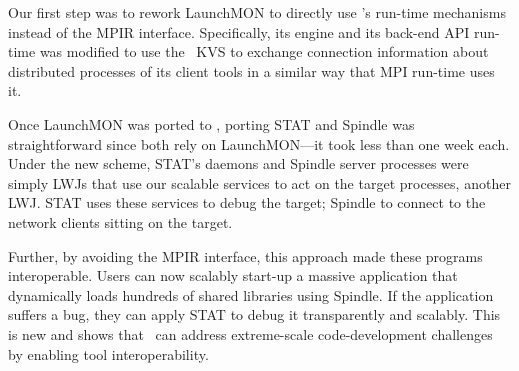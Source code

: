 Our first step was to rework LaunchMON
to directly use \flux's run-time mechanisms instead 
of the MPIR interface. Specifically, its engine
and its back-end API run-time
was modified to use the \flux\ KVS
to exchange connection information about 
distributed processes of its client tools in a similar way that MPI run-time 
uses it. 

Once LaunchMON was ported to \flux, porting
STAT and {\sc Spindle} was
straightforward since both rely on LaunchMON---it took less than one week each.
Under the new scheme, STAT's daemons 
and {\sc Spindle} server processes were simply LWJs 
that use our scalable services to act on the target processes, 
another LWJ. STAT uses these services to debug the 
target; {\sc Spindle} to connect to the network clients sitting on the target.

Further, by avoiding the MPIR interface, 
this approach made these programs interoperable.
Users can now scalably start-up a massive application 
that dynamically loads hundreds of shared libraries 
using {\sc Spindle}.
If the application suffers a bug, they can apply
STAT to debug it transparently and scalably.
This is new and shows that \flux\ can address extreme-scale 
code-development challenges by enabling tool interoperability.
